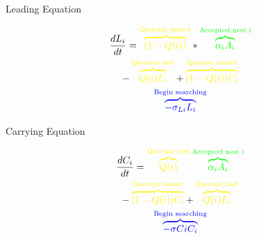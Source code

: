 \documentclass{beamer}
\makeatletter
\def\mcolor#1#{\@mcolor{#1}}
\def\@mcolor#1#2#3{%
  \protect\leavevmode
  \begingroup
    \color#1{#2}#3%
  \endgroup
}
\newcommand{\annotate}[3]{
\mcolor{#1}{\overbrace{#3}^\text{#2}}
}
\makeatother
\begin{document}
\begin{frame}{Leading Equation}

\begin{multline}
    \frac{dL_i}{dt} = \annotate{yellow}{Quorum unmet}{(1-Q(i))} * \annotate{green}{Accepted nest i}{\alpha_iA_i} \\ - \annotate{yellow}{Quorum met}{Q(i)L_i} + \annotate{yellow}{Quorum unmet}{(1 - Q(i))C_i} \\ \annotate{blue}{Begin searching}{- \sigma_{Li}L_i}
\end{multline}

\end{frame}

\begin{frame}{Carrying Equation}

\begin{multline}
    \frac{dC_i}{dt} = \annotate{yellow}{Qourum met}{Q(i)}\annotate{green}{Accepted nest i}{\alpha_iA_i} \\ - \annotate{yellow}{Quorum unmet}{(1 - Q(i))C_i} + \annotate{yellow}{Quorum met}{Q(i)L_i} \\ \annotate{blue}{Begin searching}{- \sigma{Ci}C_i}
\end{multline}


\end{frame}
\end{document}
